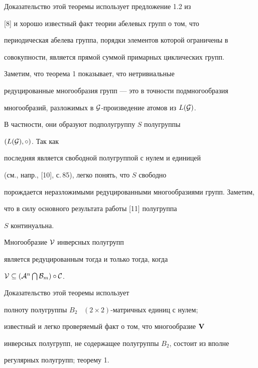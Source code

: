 Доказательство этой теоремы использует предложение 1.2 из


[8] и хорошо известный факт теории абелевых групп о том, что


периодическая абелева группа, порядки элементов которой ограничены в


совокупности, является прямой суммой примарных циклических групп. 





Заметим, что теорема 1 показывает, что нетривиальные


редуцированные многообразия групп --- это в точности подмногообразия


многообразий, разложимых в ${\cal G}$-произведение атомов из $L({\cal G})$.


В частности, они образуют подполугруппу $S$ полугруппы


$(L({\cal G}), \circ)$. Так как


последняя является свободной полугруппой с нулем и единицей


(см., напр., [10], с.\,85), легко понять, что $S$ свободно


порождается неразложимыми редуцированными многообразиями групп. Заметим,


что в силу основного результата работы [11] полугруппа


$S$ континуальна.





\begin{thm}


Многообразие ${\cal V}$ инверсных полугрупп


является редуцированным тогда и только тогда, когда


${\cal V}\subseteq ({\cal A}^n \bigcap {\cal B}_m)\circ {\cal C}$.


\end{thm}





Доказательство этой теоремы использует


полноту полугруппы $B_2$ \ $(2\times2)$-матричных единиц с нулем;


известный и легко проверяемый факт о том, что многообразие ${\bold V}$


инверсных полугрупп, не содержащее полугруппы $B_2$, состоит из вполне


регулярных полугрупп; теорему 1.






